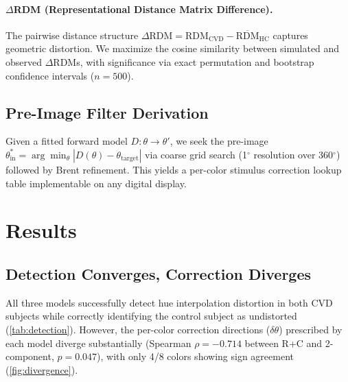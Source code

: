 \documentclass{article}
\begin{document}
\paragraph{$\Delta$RDM (Representational Distance Matrix Difference).}
The pairwise distance structure $\Delta\text{RDM} = \text{RDM}_{\text{CVD}} - \overline{\text{RDM}}_{\text{HC}}$ captures geometric distortion.
We maximize the cosine similarity between simulated and observed $\Delta$RDMs, with significance via exact permutation and bootstrap confidence intervals ($n=500$).

\subsection{Pre-Image Filter Derivation}

Given a fitted forward model $D: \theta \to \theta'$, we seek the pre-image $\theta_{\text{in}}^* = \arg\min_\theta |D(\theta) - \theta_{\text{target}}|$ via coarse grid search (1$^\circ$ resolution over 360$^\circ$) followed by Brent refinement.
This yields a per-color stimulus correction lookup table implementable on any digital display.

\section{Results}
\label{sec:results}

\subsection{Detection Converges, Correction Diverges}

All three models successfully detect hue interpolation distortion in both CVD subjects while correctly identifying the control subject as undistorted (\cref{tab:detection}).
However, the per-color correction directions ($\delta\theta$) prescribed by each model diverge substantially (Spearman $\rho = -0.714$ between R+C and 2-component, $p = 0.047$), with only 4/8 colors showing sign agreement (\cref{fig:divergence}).
\end{document}
